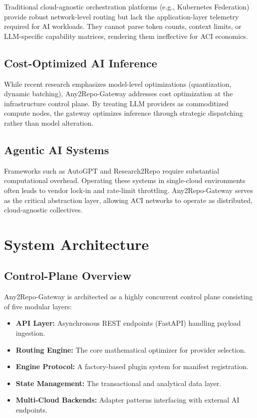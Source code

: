 \documentclass[10pt]{article}
\begin{document}
Traditional cloud-agnostic orchestration platforms (e.g., Kubernetes Federation) provide robust network-level routing but lack the application-layer telemetry required for AI workloads. They cannot parse token counts, context limits, or LLM-specific capability matrices, rendering them ineffective for ACI economics.

\subsection{Cost-Optimized AI Inference}

While recent research emphasizes model-level optimizations (quantization, dynamic batching), Any2Repo-Gateway addresses cost optimization at the infrastructure control plane. By treating LLM providers as commoditized compute nodes, the gateway optimizes inference through strategic dispatching rather than model alteration.

\subsection{Agentic AI Systems}

Frameworks such as AutoGPT and Research2Repo require substantial computational overhead. Operating these systems in single-cloud environments often leads to vendor lock-in and rate-limit throttling. Any2Repo-Gateway serves as the critical abstraction layer, allowing ACI networks to operate as distributed, cloud-agnostic collectives.

\section{System Architecture}

\subsection{Control-Plane Overview}

Any2Repo-Gateway is architected as a highly concurrent control plane consisting of five modular layers:

\begin{itemize}
    \item \textbf{API Layer:} Asynchronous REST endpoints (FastAPI) handling payload ingestion.
    \item \textbf{Routing Engine:} The core mathematical optimizer for provider selection.
    \item \textbf{Engine Protocol:} A factory-based plugin system for manifest registration.
    \item \textbf{State Management:} The transactional and analytical data layer.
    \item \textbf{Multi-Cloud Backends:} Adapter patterns interfacing with external AI endpoints.
\end{itemize}
\end{document}
